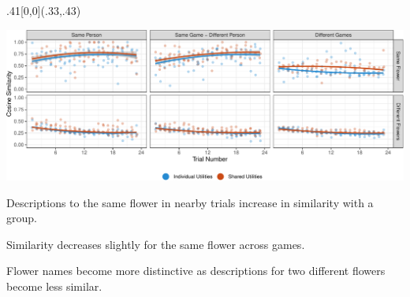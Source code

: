 \documentclass[10pt, xcolor=table, dvipsnames]{beamer}
\begin{document}
	
		\begin{textblock}{.41}[0,0](.33,.43)

		\begin{tcolorbox}[title={\centering Expressions converge within groups}]  
			\includegraphics[width=.95\textwidth]{during-1.pdf}                            			                                                  
			\begin{small}
				
				Descriptions to the same flower in nearby trials increase in similarity with a group. 
				
				Similarity decreases slightly for the same flower across games. 
				
				Flower names become more distinctive as descriptions for two different flowers become less similar. 
				
			\end{small}
		\end{tcolorbox}
	\end{textblock}
\end{document}

